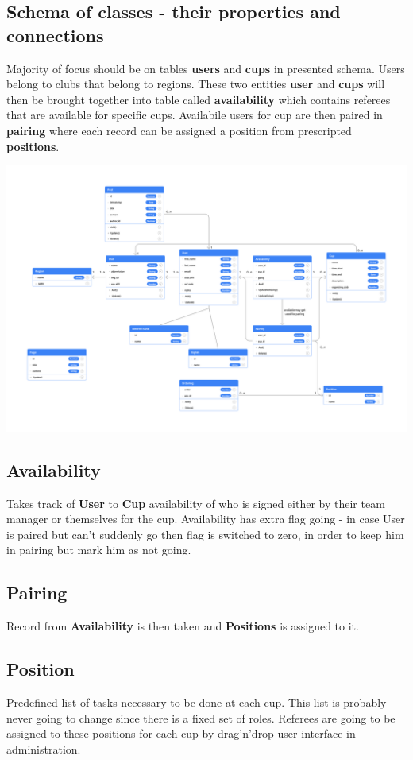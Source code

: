\subsection*{Schema of classes - their properties and connections}
Majority of focus should be on tables \textbf{users} and \textbf{cups} in presented schema. Users belong to clubs that belong to regions. These two entities \textbf{user} and \textbf{cups} will then be brought together into table called \textbf{availability} which contains referees that are available for specific cups. Availabile users for cup are then paired in \textbf{pairing} where each record can be assigned a position from prescripted \textbf{positions}.
\newline
\begin{center}
\includegraphics[scale=0.160]{img/swimmpair_uml.png}
\end{center}
\subsection*{Availability}
Takes track of \textbf{User} to \textbf{Cup} availability of who is signed either by their team manager or themselves for the cup. Availability has extra flag going - in case User is paired but can't suddenly go then flag is switched to zero, in order to keep him in pairing but mark him as not going.
\subsection*{Pairing}
Record from \textbf{Availability} is then taken and \textbf{Positions} is assigned to it. 
\subsection*{Position}
Predefined list of tasks necessary to be done at each cup. This list is probably never going to change since there is a fixed set of roles. Referees are going to be assigned to these positions for each cup by drag'n'drop user interface in administration.
\newpage
